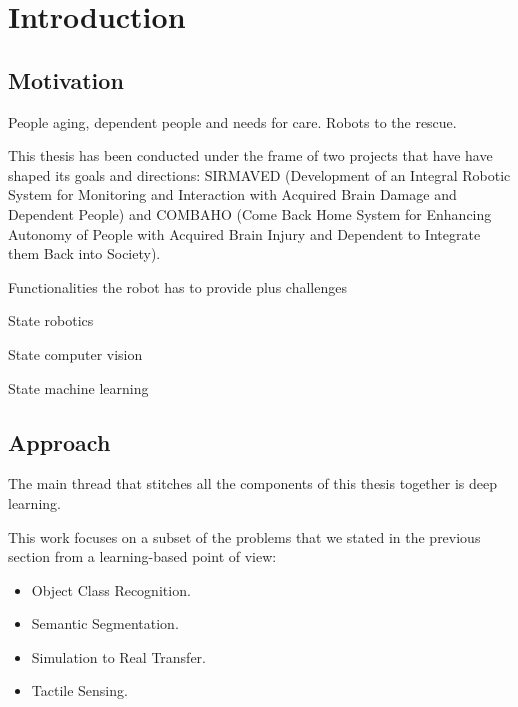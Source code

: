 \chapter{Introduction}
\label{cha:introduction}

\begin{chapterabstract}
\end{chapterabstract}

\minitoc

\clearpage

\section{Motivation}
\label{cha:introduction:sec:motivation}

People aging, dependent people and needs for care. Robots to the rescue.

This thesis has been conducted under the frame of two projects that have have shaped its goals and directions: SIRMAVED (Development of an Integral Robotic System for Monitoring and Interaction with Acquired Brain Damage and Dependent People) and COMBAHO (Come Back Home System for Enhancing Autonomy of People with Acquired Brain Injury and Dependent to Integrate them Back into Society).

Functionalities the robot has to provide plus challenges

State robotics

State computer vision

State machine learning

\section{Approach}
\label{cha:introduction:sec:approach}

The main thread that stitches all the components of this thesis together is deep learning.

This work focuses on a subset of the problems that we stated in the previous section from a learning-based point of view:

\begin{itemize}
    \item Object Class Recognition.
    \item Semantic Segmentation.
    \item Simulation to Real Transfer.
    \item Tactile Sensing.
\end{itemize}

